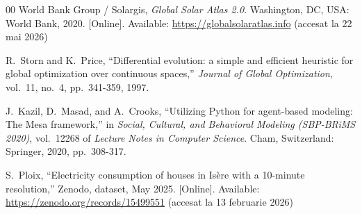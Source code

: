 \documentclass[12pt,a4paper]{report}
\begin{document}
\begin{thebibliography}{00}
  World Bank Group / Solargis,
  \emph{Global Solar Atlas 2.0}.
  Washington, DC, USA: World Bank, 2020. [Online]. Available: \url{https://globalsolaratlas.info} (accesat la 22 mai 2026)

  R.~Storn and K.~Price,
  ``Differential evolution: a simple and efficient heuristic for global optimization over continuous spaces,''
  \emph{Journal of Global Optimization}, vol.~11, no.~4, pp.~341-359, 1997.

  J.~Kazil, D.~Masad, and A.~Crooks,
  ``Utilizing Python for agent-based modeling: The Mesa framework,''
  in \emph{Social, Cultural, and Behavioral Modeling (SBP-BRiMS 2020)}, vol.~12268 of \emph{Lecture Notes in Computer Science}.
  Cham, Switzerland: Springer, 2020, pp.~308-317.

  S.~Ploix,
  ``Electricity consumption of houses in Isère with a 10-minute resolution,''
  Zenodo, dataset, May 2025. [Online]. Available: \url{https://zenodo.org/records/15499551} (accesat la 13 februarie 2026)

\end{thebibliography}
\end{document}
